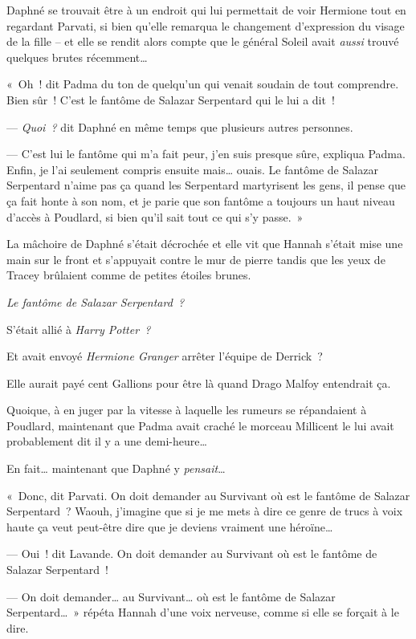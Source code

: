 Daphné se trouvait être à un endroit qui lui permettait de voir Hermione tout en regardant Parvati, si bien qu'elle remarqua le changement d'expression du visage de la fille -- et elle se rendit alors compte que le général Soleil avait \emph{aussi} trouvé quelques brutes récemment…

«~Oh~! dit Padma du ton de quelqu'un qui venait soudain de tout comprendre. Bien sûr~! C'est le fantôme de Salazar Serpentard qui le lui a dit~!

--- \emph{Quoi~?} dit Daphné en même temps que plusieurs autres personnes.

--- C'est lui le fantôme qui m'a fait peur, j'en suis presque sûre, expliqua Padma. Enfin, je l'ai seulement compris ensuite mais… ouais. Le fantôme de Salazar Serpentard n'aime pas ça quand les Serpentard martyrisent les gens, il pense que ça fait honte à son nom, et je parie que son fantôme a toujours un haut niveau d'accès à Poudlard, si bien qu'il sait tout ce qui s'y passe.~»

La mâchoire de Daphné s'était décrochée et elle vit que Hannah s'était mise une main sur le front et s'appuyait contre le mur de pierre tandis que les yeux de Tracey brûlaient comme de petites étoiles brunes.

\emph{Le fantôme de Salazar Serpentard~?}

S'était allié à \emph{Harry Potter~?}

Et avait envoyé \emph{Hermione Granger} arrêter l'équipe de Derrick~?

Elle aurait payé cent Gallions pour être là quand Drago Malfoy entendrait ça.

Quoique, à en juger par la vitesse à laquelle les rumeurs se répandaient à Poudlard, maintenant que Padma avait craché le morceau Millicent le lui avait probablement dit il y a une demi-heure…

En fait… maintenant que Daphné y \emph{pensait}…

«~Donc, dit Parvati. On doit demander au Survivant où est le fantôme de Salazar Serpentard~? Waouh, j'imagine que si je me mets à dire ce genre de trucs à voix haute ça veut peut-être dire que je deviens vraiment une héroïne…

--- Oui~! dit Lavande. On doit demander au Survivant où est le fantôme de Salazar Serpentard~!

--- On doit demander… au Survivant… où est le fantôme de Salazar Serpentard…~» répéta Hannah d'une voix nerveuse, comme si elle se forçait à le dire.

